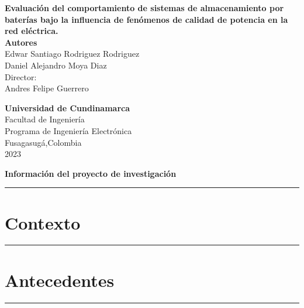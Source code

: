 \documentclass[12pt,twoside]{article}
\date{}
\begin{document}
\begin{titlepage}
\begin{center}

{\Large \textbf{Evaluación del comportamiento de sistemas de almacenamiento por baterías bajo la influencia de fenómenos de calidad de potencia en la red eléctrica.}}\\%
\vspace*{2\baselineskip}
\textbf{Autores}\\
\vspace*{0.2\baselineskip}
Edwar Santiago Rodriguez Rodriguez \\[0.2cm]
Daniel Alejandro Moya Diaz\\[0.2cm]

\vspace*{3.5\baselineskip}
Director:\\
Andres Felipe Guerrero\\
\vspace*{2\baselineskip}


\vfill %
\textbf{Universidad de Cundinamarca} \\
Facultad de Ingeniería\\
Programa de Ingeniería Electrónica\\
Fusagasug\'{a},Colombia\\
2023

\end{center}
\end{titlepage}
\newpage
\begin{center}
{\LARGE \textbf{Información del proyecto de investigación }}
\end{center}
\vspace*{0.09\baselineskip}
\hrule
\vspace*{0.2\baselineskip}

\newpage
\section{Contexto}
\vspace*{0.08\baselineskip}
\hrule
\vspace*{0.2\baselineskip}


\newpage
\section{Antecedentes}
\vspace*{0.08\baselineskip}
\hrule
\vspace*{0.7\baselineskip}

\end{document}
